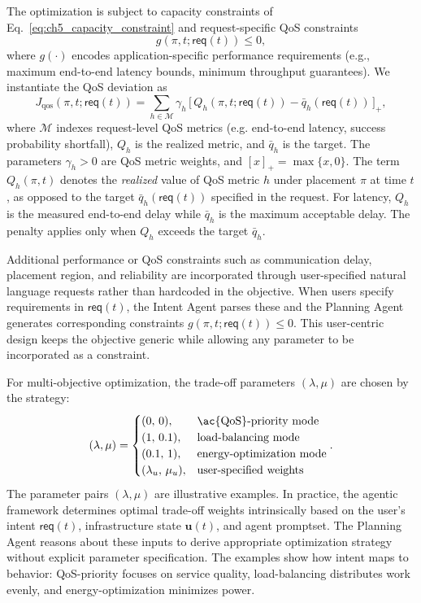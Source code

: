 The optimization is subject to capacity constraints of Eq.~\ref{eq:ch5_capacity_constraint} and request-specific \ac{QoS} constraints
\begin{equation}
g(\pi, t; \mathsf{req}(t)) \le 0,
\label{eq:ch5_qos_constraints}
\end{equation}
where $g(\cdot)$ encodes application-specific performance requirements (e.g., maximum end-to-end latency bounds, minimum throughput guarantees).
We instantiate the \ac{QoS} deviation as
\begin{equation}
J_{\mathrm{qos}}(\pi, t; \mathsf{req}(t)) = \sum_{h \in \mathcal{M}} \gamma_h \, \big[\, Q_h(\pi, t; \mathsf{req}(t)) - \bar{q}_h(\mathsf{req}(t)) \,\big]_+,
\label{eq:ch5_qos_penalty}
\end{equation}
where $\mathcal{M}$ indexes request-level \ac{QoS} metrics (e.g. end-to-end latency, success probability shortfall), $Q_h$ is the realized metric, and $\bar{q}_h$ is the target. The parameters $\gamma_h>0$ are \ac{QoS} metric weights, and $[x]_+ = \max\{x,0\}$. The term $Q_h(\pi, t)$ denotes the \textit{realized} value of \ac{QoS} metric $h$ under placement $\pi$ at time $t$, as opposed to the target $\bar{q}_h(\mathsf{req}(t))$ specified in the request. For latency, $Q_h$ is the measured end-to-end delay while $\bar{q}_h$ is the maximum acceptable delay. The penalty applies only when $Q_h$ exceeds the target $\bar{q}_h$.

Additional performance or \ac{QoS} constraints such as communication delay, placement region, and reliability are incorporated through user-specified natural language requests rather than hardcoded in the objective. When users specify requirements in $\mathsf{req}(t)$, the Intent Agent parses these and the Planning Agent generates corresponding constraints $g(\pi, t; \mathsf{req}(t)) \le 0$. This user-centric design keeps the objective generic while allowing any parameter to be incorporated as a constraint.

For multi-objective optimization, the trade-off parameters $(\lambda,\mu)$ are chosen by the strategy:
\begin{align}
(\lambda, \mu) = \begin{cases}
(0,\, 0), & \text{\ac{QoS}-priority mode} \\
(1,\, 0.1), & \text{load-balancing mode} \\
(0.1,\, 1), & \text{energy-optimization mode} \\
(\lambda_u,\, \mu_u), & \text{user-specified weights}
\end{cases}.
\end{align}
The parameter pairs $(\lambda, \mu)$ are illustrative examples. In practice, the agentic framework determines optimal trade-off weights intrinsically based on the user's intent $\mathsf{req}(t)$, infrastructure state $\mathbf{u}(t)$, and agent promptset. The Planning Agent reasons about these inputs to derive appropriate optimization strategy without explicit parameter specification. The examples show how intent maps to behavior: \ac{QoS}-priority focuses on service quality, load-balancing distributes work evenly, and energy-optimization minimizes power.

